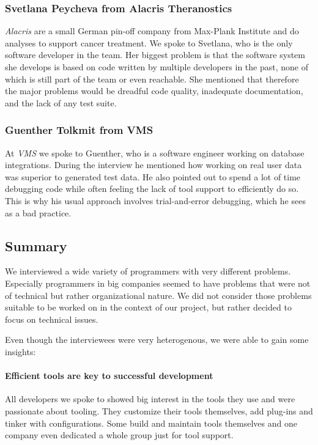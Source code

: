 \subsubsection{Svetlana Peycheva from Alacris Theranostics} \emph{Alacris} are a small German pin-off company from Max-Plank Institute and do analyses to support cancer treatment. We spoke to Svetlana, who is the only software developer in the team. Her biggest problem is that the software system she develops is based on code written by multiple developers in the past, none of which is still part of the team or even reachable. She mentioned that therefore the major problems would be dreadful code quality, inadequate documentation, and the lack of any test suite.

\subsubsection{Guenther Tolkmit from VMS} At \emph{VMS} we spoke to Guenther, who is a software engineer working on database integrations. During the interview he mentioned how working on real user data was superior to generated test data. He also pointed out to spend a lot of time debugging code while often feeling the lack of tool support to efficiently do so. This is why his usual approach involves trial-and-error debugging, which he sees as a bad practice.

\subsection{Summary} We interviewed a wide variety of programmers with very different problems. Especially programmers in big companies seemed to have problems that were not of technical but rather organizational nature. We did not consider those problems suitable to be worked on in the context of our project, but rather decided to focus on technical issues.

Even though the interviewees were very heterogenous, we were able to gain some insights:

\paragraph{Efficient tools are key to successful development} All developers we spoke to showed big interest in the tools they use and were passionate about tooling. They customize their tools themselves, add plug-ins and tinker with configurations. Some build and maintain tools themselves and one company even dedicated a whole group just for tool support.


